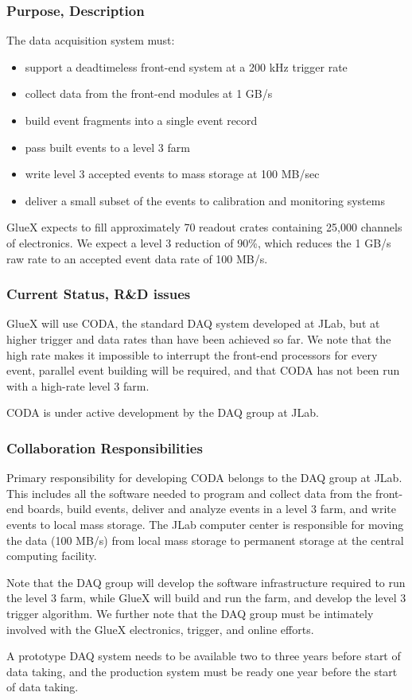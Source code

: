 \subsubsection*{Purpose, Description}

The data acquisition system must:
\begin{itemize}
\item support a deadtimeless front-end system at a 200 kHz trigger rate
\item collect data from the front-end modules at 1 GB/s
\item build event fragments into a single event record
\item pass built events to a level 3 farm
\item write level 3 accepted events to mass storage at 100 MB/sec
\item deliver a small subset of the events to calibration and
  monitoring systems
\end{itemize}

GlueX expects to fill approximately 70 readout crates 
containing 25,000 channels of electronics. 
We expect a level 3 reduction of 90\%, which reduces the 1 GB/s raw
rate to an accepted event data rate of 100 MB/s.

\subsubsection*{Current Status, R\&D issues}

GlueX will use CODA, the standard DAQ system developed at JLab, but at
higher trigger and data rates than have been achieved so far.  We note
that the high rate makes it impossible to interrupt the front-end
processors for every event, parallel event building will be required,
and that CODA has not been run with a high-rate level 3 farm.

CODA is under active development by the DAQ group at JLab.



\subsubsection*{Collaboration Responsibilities}

Primary responsibility for developing CODA belongs to the DAQ group at
JLab.  This includes all the software needed to  
program and collect data from the front-end boards,
build events,
deliver and analyze events in a level 3 farm,
and write events to local mass storage.
The JLab computer center is responsible for moving the data (100
MB/s) from local mass storage to permanent storage at the central
computing facility.

Note that the DAQ group will develop the software infrastructure
required to run the level 3 farm, while GlueX will build and run the
farm, and develop the level 3 trigger algorithm.  We further note that
the DAQ group must be intimately involved with the GlueX electronics,
trigger, and online efforts.

A prototype DAQ system needs to be available two to three years before
start of data taking, and the production system must be ready one year
before the start of data taking.

